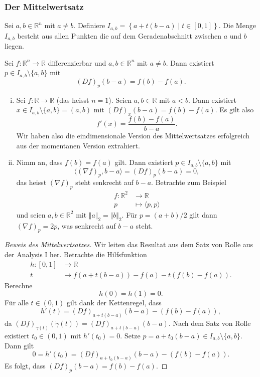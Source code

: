 \documentclass[../main.tex]{subfiles}
\begin{document}
\subsubsection*{Der Mittelwertsatz}
Sei $a, b \in \mathbb{R}^n$ mit $a \neq b$.
Definiere $I_{a, b} = \left\{a + t(b-a) \mid t \in [0, 1]\right\}$.
Die Menge $I_{a, b}$ besteht aus allen Punkten die auf dem Geradenabschnitt
zwischen $a$ und $b$ liegen.

\begin{theorem}[Mittelwertsatz]
  Sei $f \colon \mathbb{R}^n \to \mathbb{R}$ differenzierbar
  und $a, b \in \mathbb{R}^n$ mit $a \neq b$.
  Dann existiert $p \in I_{a, b} \setminus \{a, b\}$ mit
  \[
    {(Df)}_p(b-a) = f(b) - f(a).
  \]
\end{theorem}

\begin{specialcases}
  \leavevmode
  \begin{enumerate}[(i)]
    \item Sei $f \colon \mathbb{R} \to \mathbb{R}$ (das heisst $n = 1$).
      Seien $a, b \in \mathbb{R}$ mit $a < b$.
      Dann existiert $x \in I_{a, b} \setminus \{a, b\} = (a, b)$ 
      mit ${(Df)}_{x}(b-a) = f(b) - f(a)$.
      Es gilt also
      \[
        f'(x) = \frac{f(b) - f(a)}{b-a}.
      \]
      Wir haben also die eindimensionale Version des Mittelwertsatzes
      erfolgreich aus der momentanen Version extrahiert.
    \item Nimm an, dass  $f(b) = f(a)$ gilt.
      Dann existiert $p \in I_{a, b} \setminus \{a, b\}$ 
      mit
      \[
        \langle {(\nabla f)}_{p}, b-a \rangle
        = {(Df)}_p(b-a) = 0,
      \]
      das heisst ${(\nabla f)}_p$ steht senkrecht auf $b-a$.
      Betrachte zum Beispiel
      \begin{align*}
        f \colon \mathbb{R}^2 & \to \mathbb{R} \\
        p & \mapsto \langle p, p \rangle
      \end{align*}
      und seien $a, b \in \mathbb{R}^2$ mit $\Vert a \Vert_2 = \Vert b \Vert_2$.
      Für $p = (a + b)/2$ gilt dann
      ${(\nabla f)}_p = 2p$, was senkrecht auf $b - a$ steht.
  \end{enumerate}
\end{specialcases}

\begin{proof}[Beweis des Mittelwertsatzes]
  Wir leiten das Resultat aus dem Satz von Rolle aus der
  Analysis I her.
  Betrachte die Hilfsfunktion
  \begin{align*}
    h \colon [0, 1] & \to \mathbb{R} \\
    t & \mapsto f(a + t(b-a)) - f(a) - t(f(b) - f(a)).
  \end{align*}
  Berechne
  \[
    h (0) = h(1) = 0.
  \]
  Für alle $t \in (0, 1)$ gilt dank der Kettenregel, dass
  \[
    h'(t) = {(Df)}_{a + t(b-a)}(b-a) - (f(b) - f(a)),
  \]
  da ${(Df)}_{\gamma(t)}(\dot \gamma(t)) = {(Df)}_{a + t(b-a)}(b-a)$.
  Nach dem Satz von Rolle existiert $t_0 \in (0, 1)$ 
  mit $h'(t_0) = 0$.
  Setze $p = a + t_0(b-a) \in I_{a, b} \setminus \{a, b\}$.
  Dann gilt
  \[
    0 = h'(t_0) = {(Df)}_{a + t_0(b-a)}(b-a) - (f(b) - f(a)).
  \]
  Es folgt, dass ${(Df)}_p(b-a) = f(b) - f(a)$.
\end{proof}
\end{document}
